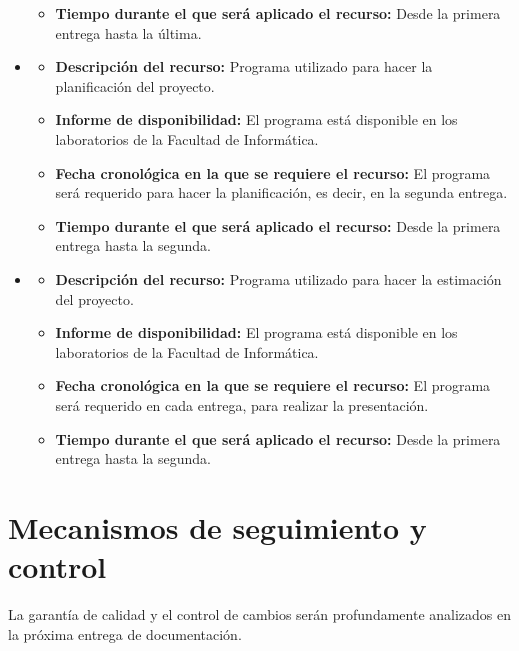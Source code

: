 \documentclass[spanish,a4paper,12pt]{report}	%
\begin{document}
\begin{itemize}
\begin{itemize}
				  	  \item \textbf{Tiempo durante el que será aplicado el recurso: }Desde la primera entrega hasta la última. 
					\end{itemize}
				\item {}
				  	\begin{itemize}
				  	  \item \textbf{Descripción del recurso: } Programa utilizado para hacer la planificación del proyecto.
				  	  \item \textbf{Informe de disponibilidad: }El programa está disponible en los laboratorios de la Facultad de Informática.
				  	  \item \textbf{Fecha cronológica en la que se requiere el recurso: }El programa será requerido para hacer la planificación, es decir, en la
				  	  					segunda entrega.
				  	  \item \textbf{Tiempo durante el que será aplicado el recurso: }Desde la primera entrega hasta la segunda. 
					\end{itemize}
				\item {}
				  	\begin{itemize}
				  	  \item \textbf{Descripción del recurso: } Programa utilizado para hacer la estimación del proyecto.
				  	  \item \textbf{Informe de disponibilidad: }El programa está disponible en los laboratorios de la Facultad de Informática.
				  	  \item \textbf{Fecha cronológica en la que se requiere el recurso: }El programa será requerido en cada entrega, para realizar la presentación.
				  	  \item \textbf{Tiempo durante el que será aplicado el recurso: }Desde la primera entrega hasta la segunda. 
					\end{itemize}
			\end{itemize} 

\newpage
\mbox{}
\thispagestyle{empty}						%
\newpage
\setcounter{section}{0}



\chapter{Mecanismos de seguimiento y control} La garantía de calidad y el control de cambios serán profundamente analizados en la próxima entrega de documentación.
\end{document}
